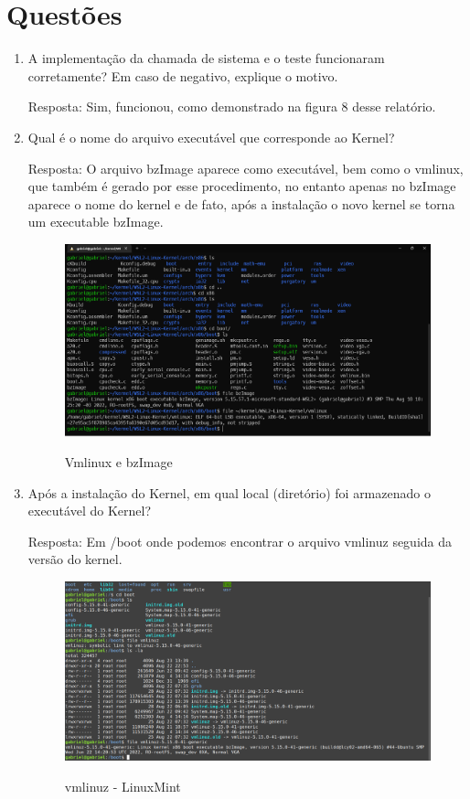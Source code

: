 \documentclass[a4paper, 12pt]{article}
\begin{document}
\section{Questões}
\begin{enumerate}
		\item A implementação da chamada de sistema e o teste funcionaram corretamente? Em caso de negativo, explique o motivo.
		
		Resposta: Sim, funcionou, como demonstrado na figura 8 desse relatório.
		
		\item Qual é o nome do arquivo executável que corresponde ao Kernel?
		
		Resposta: O arquivo bzImage aparece como executável, bem como o vmlinux, que também é gerado por esse procedimento, no entanto apenas no bzImage aparece o nome do kernel e de fato, após a instalação o novo kernel se torna um executable bzImage.
		
		\begin{figure}[!ht]
            \centering 
            \includegraphics[width=13.5cm]{file.png}
            \label{figura:file}
            \caption{Vmlinux e bzImage}
        \end{figure}
        		
        \newpage
        
		\item Após a instalação do Kernel, em qual local (diretório) foi armazenado o executável do Kernel?
		
		Resposta: Em /boot onde podemos encontrar o arquivo vmlinuz seguida da versão do kernel.
		
		\begin{figure}[!ht]
            \centering 
            \includegraphics[width=13.5cm]{vmlinuz.png}
            \label{figura:vmlinuz}
            \caption{vmlinuz - LinuxMint}
        \end{figure}
		

\end{enumerate}
\end{document}

